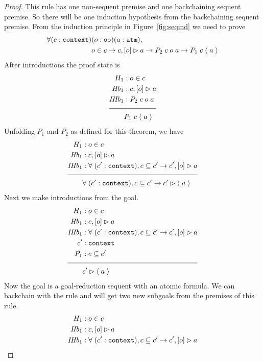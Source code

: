 \begin{proof}
This rule has one non-sequent premise and one backchaining sequent premise. So there will be one induction hypothesis from the backchaining sequent premise. From the induction principle in Figure~\ref{fig:seqind} we need to prove
\begin{align*}
\forall (c : \sltm{context}) & (o : \sltm{oo}) (a : \sltm{atm}), \\
& o \in c \rightarrow \bchsl[c]{o}{a} \rightarrow P_2 \; c \; o \; a \rightarrow P_1 \; c \; \atom{a}
\end{align*}
After introductions the proof state is
\begin{align*}
H_1 &: o \in c \\
\mathit{Hb}_1 &: \bchsl[c]{o}{a} \\
\mathit{IHb}_1 &: P_2 \; c \; o \; a \\[\pfshift{}]
\cline{1-2}
& P_1 \; c \; \atom{a}
\end{align*}
Unfolding $P_1$ and $P_2$ as defined for this theorem, we have
\begin{align*}
H_1 &: o \in c \\
\mathit{Hb}_1 &: \bchsl[c]{o}{a} \\
\mathit{IHb}_1 &: \forall \; (\inddyncon{} : \sltm{context}), c \subseteq \inddyncon{} \rightarrow \bchsl[\inddyncon{}]{o}{a} \\[\pfshift{}]
\cline{1-2}
& \forall \; (\inddyncon{} : \sltm{context}), c \subseteq \inddyncon{} \rightarrow \seqsl[\inddyncon{}]{\atom{a}}
\end{align*}
Next we make introductions from the goal.
\begin{align*}
H_1 &: o \in c \\
\mathit{Hb}_1 &: \bchsl[c]{o}{a} \\
\mathit{IHb}_1 &: \forall \; (\inddyncon{} : \sltm{context}), c \subseteq \inddyncon{} \rightarrow \bchsl[\inddyncon{}]{o}{a} \\
\inddyncon{} &: \sltm{context} \\
P_1 &: c \subseteq \inddyncon{} \\[\pfshift{}]
\cline{1-2}
& \seqsl[\inddyncon{}]{\atom{a}}
\end{align*}
Now the goal is a goal-reduction sequent with an atomic formula. We can backchain with the rule \rlnmsinit{} and will get two new subgoals from the premises of this rule.
\begin{align*}
H_1 &: o \in c \\
\mathit{Hb}_1 &: \bchsl[c]{o}{a} \\
\mathit{IHb}_1 &: \forall \; (\inddyncon{} : \sltm{context}), c \subseteq \inddyncon{} \rightarrow \bchsl[\inddyncon{}]{o}{a} \\

\end{align*}
\end{proof}
